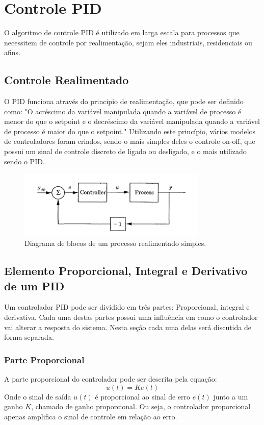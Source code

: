 \section{Controle PID}
O algoritmo de controle PID é utilizado em larga escala para processos que necessitem de controle por realimentação, sejam eles industriais, residenciais ou afins. \cite{astrom1995}
\par
\subsection{Controle Realimentado}
O PID funciona através do principio de realimentação, que pode ser definido como: "O acréscimo da variável manipulada quando a variável de processo é menor do que o setpoint e o decréscimo da variável manipulada quando a variável de processo é maior do que o setpoint."  Utilizando este princípio, vários modelos de controladores foram criados, sendo o mais simples deles o controle on-off, que possui um sinal de controle discreto de ligado ou desligado, e o mais utilizado sendo o PID. \cite{astrom1995}

\begin{figure}[ht]
    \centering
    \includegraphics[width=0.8\textwidth]{capitulos/processo_feedback.png}
    \caption{Diagrama de blocos de um processo realimentado simples. \cite{astrom1995}}
    \label{fig:processo_feedback}
\end{figure}
\subsection{Elemento Proporcional, Integral e Derivativo de um PID}
Um controlador PID pode ser dividido em três partes: Proporcional, integral e derivativa. Cada uma destas partes possui uma influência em como o controlador vai alterar a resposta do sistema. \cite{ogata2011engenharia} Nesta seção cada uma delas será discutida de forma separada.
\subsubsection{Parte Proporcional}
A parte proporcional do controlador pode ser descrita pela equação: 
\begin{equation}
    u(t) = K e(t)
\end{equation}
Onde o sinal de saída $u(t)$ é proporcional ao sinal de erro $e(t)$ junto a um ganho $K$, chamado de ganho proporcional. Ou seja, o controlador proporcional apenas amplifica o sinal de controle em relação ao erro. \cite{ogata2011engenharia}


